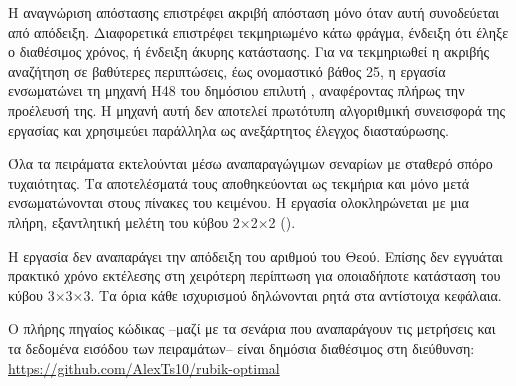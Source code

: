 Η αναγνώριση απόστασης επιστρέφει ακριβή απόσταση μόνο όταν αυτή συνοδεύεται από απόδειξη. Διαφορετικά επιστρέφει τεκμηριωμένο κάτω φράγμα, ένδειξη ότι έληξε ο διαθέσιμος χρόνος, ή ένδειξη άκυρης κατάστασης. Για να τεκμηριωθεί η ακριβής αναζήτηση σε βαθύτερες περιπτώσεις, έως ονομαστικό βάθος 25, η εργασία ενσωματώνει τη μηχανή H48 του δημόσιου επιλυτή , αναφέροντας πλήρως την προέλευσή της. Η μηχανή αυτή δεν αποτελεί πρωτότυπη αλγοριθμική συνεισφορά της εργασίας και χρησιμεύει παράλληλα ως ανεξάρτητος έλεγχος διασταύρωσης.

Όλα τα πειράματα εκτελούνται μέσω αναπαραγώγιμων σεναρίων με σταθερό σπόρο τυχαιότητας. Τα αποτελέσματά τους αποθηκεύονται ως τεκμήρια και μόνο μετά ενσωματώνονται στους πίνακες του κειμένου. Η εργασία ολοκληρώνεται με μια πλήρη, εξαντλητική μελέτη του κύβου 2×2×2 ().

Η εργασία δεν αναπαράγει την απόδειξη του αριθμού του Θεού. Επίσης δεν εγγυάται πρακτικό χρόνο εκτέλεσης στη χειρότερη περίπτωση για οποιαδήποτε κατάσταση του κύβου 3×3×3. Τα όρια κάθε ισχυρισμού δηλώνονται ρητά στα αντίστοιχα κεφάλαια.

Ο πλήρης πηγαίος κώδικας --μαζί με τα σενάρια που αναπαράγουν τις μετρήσεις και τα δεδομένα εισόδου των πειραμάτων-- είναι δημόσια διαθέσιμος στη διεύθυνση: \url{https://github.com/AlexTs10/rubik-optimal}

